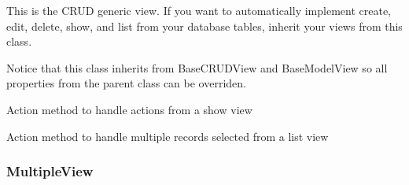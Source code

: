 \documentclass[letterpaper,10pt,english]{sphinxmanual}
\begin{document}
\begin{fulllineitems}
\label{api:flask.ext.appbuilder.views.ModelView}
This is the CRUD generic view.
If you want to automatically implement create, edit,
delete, show, and list from your database tables, inherit your views from this class.

Notice that this class inherits from BaseCRUDView and BaseModelView
so all properties from the parent class can be overriden.

\begin{fulllineitems}
\label{api:flask.ext.appbuilder.views.ModelView.action}
Action method to handle actions from a show view

\end{fulllineitems}


\begin{fulllineitems}
\label{api:flask.ext.appbuilder.views.ModelView.action_post}
Action method to handle multiple records selected from a list view

\end{fulllineitems}


\end{fulllineitems}



\subsubsection{MultipleView}
\label{api:multipleview}
\end{document}

